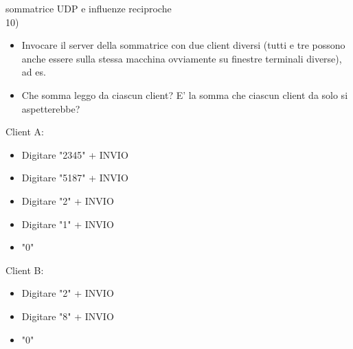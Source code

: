 \documentclass[11pt]{article}
\begin{document}
\begin{tcolorbox}[colback=blue!5!white,colframe=blue!75!black,title=\textbf{DOMANDA}, breakable]
sommatrice UDP e influenze reciproche\\
10)
\begin{itemize}
    \item Invocare il server della sommatrice con due client diversi (tutti e tre possono anche essere sulla stessa macchina ovviamente su finestre terminali diverse), ad es.
    \item Che somma leggo da ciascun client? E' la somma che ciascun client da solo si aspetterebbe?
\end{itemize}

Client A:
\begin{itemize}
    \item Digitare "2345" + INVIO
    \item Digitare "5187" + INVIO
    \item Digitare "2" + INVIO
    \item Digitare "1" + INVIO
    \item "0"
\end{itemize}

Client B:
\begin{itemize}
    \item Digitare "2" + INVIO
    \item Digitare "8" + INVIO
    \item "0"
\end{itemize}
\end{tcolorbox}
\end{document}
